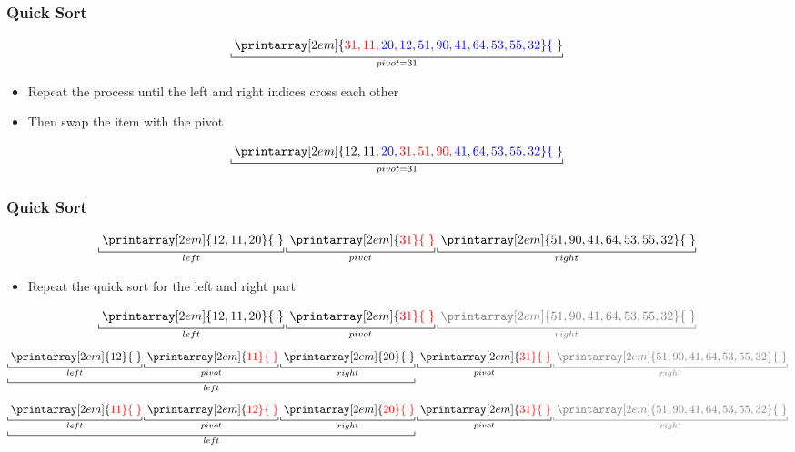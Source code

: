 \documentclass[newPxFont,sthlmFooter,nooffset]{beamer}
\begin{document}
\begin{frame}[t, fragile]
  \frametitle{Quick Sort}
\[
\underbracket[0.5pt]{{\thickspace}\printarray[2em]{\color{red}31, 11, \color{blue}20, 12, 51, 90, \color{blue}41, 64, 53, 55, 32}{\thickspace}}_{pivot=31}
\]
\begin{itemize}
\item Repeat the process until the left and right indices cross each other
\item Then swap the item with the pivot
\end{itemize}
\[
\underbracket[0.5pt]{{\thickspace}\printarray[2em]{12, 11, \color{blue}20, \color{red}31, 51, 90, \color{blue}41, 64, 53, 55, 32}{\thickspace}}_{pivot=31}
\] 
\end{frame}


\begin{frame}[t, fragile]
  \frametitle{Quick Sort}
\[
\underbracket[0.5pt]{{\thickspace}\printarray[2em]{12, 11, 20}{\thickspace}}_{left}
\underbracket[0.5pt]{{\thickspace}\printarray[2em]{\color{red}31}{\thickspace}}_{pivot}
\underbracket[0.5pt]{{\thickspace}\printarray[2em]{51, 90, 41, 64, 53, 55, 32}{\thickspace}}_{right}
\] 

\begin{itemize}
\item Repeat the quick sort for the left and right part
\end{itemize}

\[
\underbracket[0.5pt]{{\thickspace}\printarray[2em]{12, 11, 20}{\thickspace}}_{left}
\underbracket[0.5pt]{{\thickspace}\printarray[2em]{\color{red}31}{\thickspace}}_{pivot}
\color{black!50}\underbracket[0.5pt]{{\thickspace}\printarray[2em]{51, 90, 41, 64, 53, 55, 32}{\thickspace}}_{right}
\] \pause
\[
\underbracket[0.5pt]{
\underbracket[0.5pt]{{\thickspace}\printarray[2em]{12}{\thickspace}}_{left} 
\underbracket[0.5pt]{{\thickspace}\printarray[2em]{\color{red}11}{\thickspace}}_{pivot}
\underbracket[0.5pt]{{\thickspace}\printarray[2em]{ 20}{\thickspace}}_{right}
}_{left}
\underbracket[0.5pt]{{\thickspace}\printarray[2em]{\color{red}31}{\thickspace}}_{pivot}
\color{black!50}\underbracket[0.5pt]{{\thickspace}\printarray[2em]{51, 90, 41, 64, 53, 55, 32}{\thickspace}}_{right}
\] \pause
\[
\underbracket[0.5pt]{
\underbracket[0.5pt]{{\thickspace}\printarray[2em]{\color{red}11}{\thickspace}}_{left} 
\underbracket[0.5pt]{{\thickspace}\printarray[2em]{\color{red}12}{\thickspace}}_{pivot}
\underbracket[0.5pt]{{\thickspace}\printarray[2em]{\color{red}20}{\thickspace}}_{right}
}_{left}
\underbracket[0.5pt]{{\thickspace}\printarray[2em]{\color{red}31}{\thickspace}}_{pivot}
\color{black!50}\underbracket[0.5pt]{{\thickspace}\printarray[2em]{51, 90, 41, 64, 53, 55, 32}{\thickspace}}_{right}
\] 



\end{frame}
\end{document}
